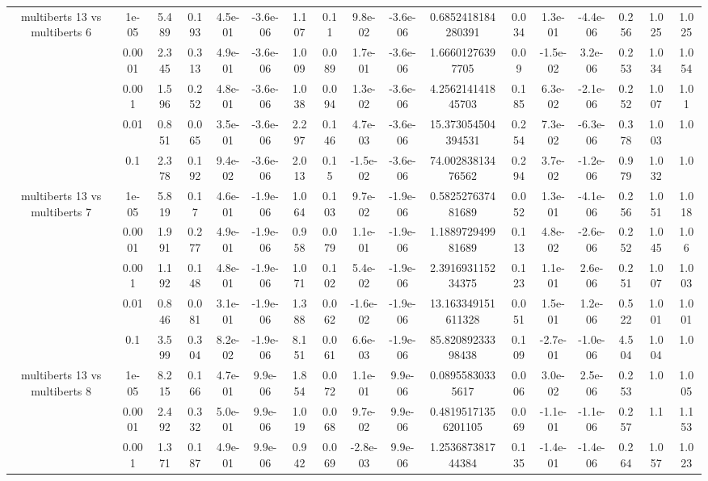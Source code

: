 \begin{tabular}{|c|c|c|c|c|c|c|c|c|c|c|c|c|c|c|c|c|}
\hline
\multirow{5}{*}{multiberts 13 vs multiberts 6} & 1e-05 & 5.489 & 0.193 & 4.5e-01 & -3.6e-06 & 1.107 & 0.11 & 9.8e-02 & -3.6e-06 & 0.6852418184280391 & 0.034 & 1.3e-01 & -4.4e-06 & 0.256 & 1.025 & 1.025 \\
 & 0.0001 & 2.345 & 0.313 & 4.9e-01 & -3.6e-06 & 1.009 & 0.089 & 1.7e-01 & -3.6e-06 & 1.66601276397705 & 0.09 & -1.5e-02 & 3.2e-06 & 0.253 & 1.034 & 1.054 \\
 & 0.001 & 1.596 & 0.252 & 4.8e-01 & -3.6e-06 & 1.038 & 0.094 & 1.3e-02 & -3.6e-06 & 4.256214141845703 & 0.185 & 6.3e-02 & -2.1e-06 & 0.252 & 1.007 & 1.01 \\
 & 0.01 & 0.851 & 0.065 & 3.5e-01 & -3.6e-06 & 2.297 & 0.146 & 4.7e-03 & -3.6e-06 & 15.373054504394531 & 0.254 & 7.3e-02 & -6.3e-06 & 0.378 & 1.003 & 1.0 \\
 & 0.1 & 2.378 & 0.192 & 9.4e-02 & -3.6e-06 & 2.013 & 0.15 & -1.5e-02 & -3.6e-06 & 74.00283813476562 & 0.294 & 3.7e-02 & -1.2e-06 & 0.979 & 1.032 & 1.0 \\
\hline
\multirow{5}{*}{multiberts 13 vs multiberts 7} & 1e-05 & 5.819 & 0.17 & 4.6e-01 & -1.9e-06 & 1.064 & 0.103 & 9.7e-02 & -1.9e-06 & 0.582527637481689 & 0.052 & 1.3e-01 & -4.1e-06 & 0.256 & 1.051 & 1.018 \\
 & 0.0001 & 1.991 & 0.277 & 4.9e-01 & -1.9e-06 & 0.958 & 0.079 & 1.1e-01 & -1.9e-06 & 1.188972949981689 & 0.113 & 4.8e-02 & -2.6e-06 & 0.252 & 1.045 & 1.06 \\
 & 0.001 & 1.192 & 0.148 & 4.8e-01 & -1.9e-06 & 1.071 & 0.102 & 5.4e-02 & -1.9e-06 & 2.391693115234375 & 0.123 & 1.1e-01 & 2.6e-06 & 0.251 & 1.007 & 1.003 \\
 & 0.01 & 0.846 & 0.081 & 3.1e-01 & -1.9e-06 & 1.388 & 0.062 & -1.6e-02 & -1.9e-06 & 13.163349151611328 & 0.051 & 1.5e-01 & 1.2e-06 & 0.522 & 1.001 & 1.001 \\
 & 0.1 & 3.599 & 0.304 & 8.2e-02 & -1.9e-06 & 8.151 & 0.061 & 6.6e-03 & -1.9e-06 & 85.82089233398438 & 0.109 & -2.7e-01 & -1.0e-06 & 4.504 & 1.004 & 1.0 \\
\hline
\multirow{5}{*}{multiberts 13 vs multiberts 8} & 1e-05 & 8.215 & 0.166 & 4.7e-01 & 9.9e-06 & 1.854 & 0.072 & 1.1e-01 & 9.9e-06 & 0.08955830335617 & 0.006 & 3.0e-02 & 2.5e-06 & 0.253 & 1.0 & 1.005 \\
 & 0.0001 & 2.492 & 0.332 & 5.0e-01 & 9.9e-06 & 1.019 & 0.068 & 9.7e-02 & 9.9e-06 & 0.48195171356201105 & 0.069 & -1.1e-01 & -1.1e-06 & 0.257 & 1.1 & 1.153 \\
 & 0.001 & 1.371 & 0.187 & 4.9e-01 & 9.9e-06 & 0.942 & 0.069 & -2.8e-03 & 9.9e-06 & 1.253687381744384 & 0.135 & -1.4e-01 & -1.4e-06 & 0.264 & 1.057 & 1.023 \\

\end{tabular}
